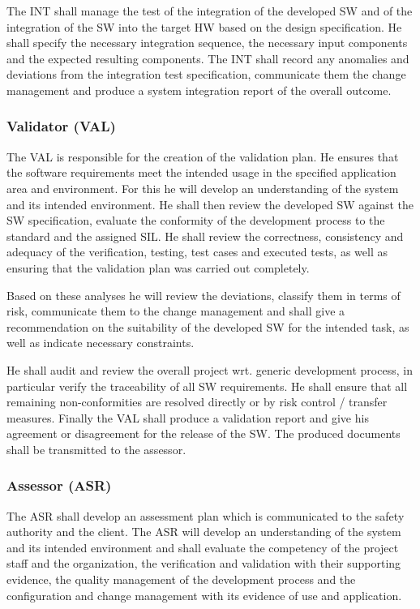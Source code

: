 The INT shall manage the test of the integration of the developed SW and of the
integration of the SW into the target HW based on the design specification. He
shall specify the necessary integration sequence, the necessary input components
and the expected resulting components. The INT shall record any anomalies and
deviations from the integration test specification, communicate them the change
management and produce a system integration report of the overall outcome.

\subsubsection{Validator (VAL)}
\label{sec:validator}

The VAL is responsible for the creation of the validation plan. He ensures that
the software requirements meet the intended usage in the specified application
area and environment. For this he will develop an understanding of the system
and its intended environment. He shall then review the developed SW against the
SW specification, evaluate the conformity of the development process to the
standard and the assigned SIL. He shall review the correctness, consistency and
adequacy of the verification, testing, test cases and executed tests, as well as
ensuring that the validation plan was carried out completely.

Based on these analyses he will review the deviations, classify them in terms
of risk, communicate them to the change management and shall give a
recommendation on the suitability of the developed SW for the intended task, as
well as indicate necessary constraints.

He shall audit and review the overall project wrt. generic development process,
in particular verify the traceability of all SW requirements. He shall ensure
that all remaining non-conformities are resolved directly or by risk control /
transfer measures. Finally the VAL shall produce a validation report and give
his agreement or disagreement for the release of the SW. The produced documents
shall be transmitted to the assessor.

\subsubsection{Assessor (ASR)}
\label{sec:assessor}

The ASR shall develop an assessment plan which is communicated to the safety
authority and the client. The ASR will develop an understanding of the system
and its intended environment and shall evaluate the competency of the project
staff and the organization, the verification and validation with their
supporting evidence, the quality management of the development process and the
configuration and change management with its evidence of use and application.

